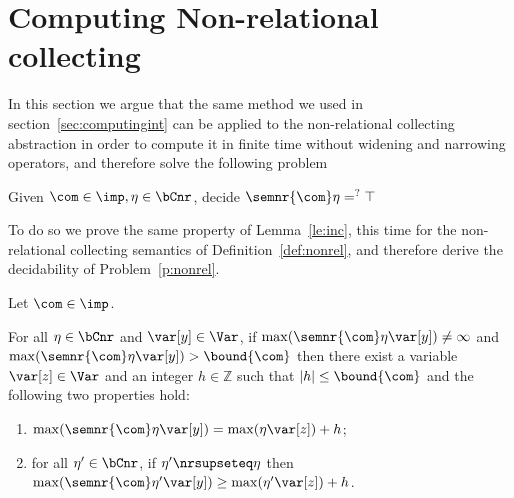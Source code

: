 \section{Computing Non-relational collecting}\label{sec:computingnonrel}

In this section we argue that the same method we used in
section~\ref{sec:computingint} can be applied to the non-relational
collecting abstraction in order to compute it in finite time without
widening and narrowing operators, and therefore solve the following
problem

\begin{problem}\label{p:nonrel}
  Given \(\com\in\imp, \eta \in \bCnr\), decide
  \(\semnr{\com}\eta =^? \top\)
\end{problem}

To do so we prove the same property of Lemma~\ref{le:inc}, this time
for the non-relational collecting semantics of
Definition~\ref{def:nonrel}, and therefore derive the decidability of
Problem~\ref{p:nonrel}.

\begin{lemma}
  \label{le:incnr}
  Let \(\com\in \imp\). %
    
  \noindent
  For all \(\eta \in \bCnr\) and \(\var[y] \in \Var\), if
  \(\max(\semnr{\com} \eta \var[y]) \neq \infty\) and
  \(\max(\semnr{\com}\eta \var[y]) > \bound{\com}\) then there exist a
  variable \(\var[z] \in \Var\) and an integer \(h \in \mathbb{Z}\)
  such that \(|h| \leq \bound{\com}\) and the following two properties
  hold:
  \begin{enumerate}[label=(\roman*)]
  \item \(\max(\semnr{\com}\eta \var[y]) = \max(\eta \var[z]) + h\); \label{point1nr}
  \item  for all \(\eta' \in \bCnr\), if \(\eta' \nrsupseteq \eta\)
    then
    \(\max(\semnr{\com}\eta' \var[y]) \geq \max(\eta' \var[z]) + h\). \label{point2nr}
  \end{enumerate}
\end{lemma}


